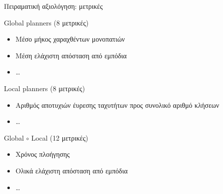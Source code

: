 \begin{frame}{Πειραματική αξιολόγηση: μετρικές}

  Global planners (8 μετρικές)
  \begin{itemize}
    \item Μέσο μήκος χαραχθέντων μονοπατιών
    \item Μέση ελάχιστη απόσταση από εμπόδια
    \item \dots
  \end{itemize}

  \vspace{0.5cm}

  Local planners (8 μετρικές)
  \begin{itemize}
    \item Αριθμός αποτυχιών έυρεσης ταχυτήτων προς συνολικό αριθμό κλήσεων
    \item \dots
  \end{itemize}

  \vspace{0.5cm}

  Global $\circ$ Local (12 μετρικές)
  \begin{itemize}
    \item Χρόνος πλοήγησης
    \item Ολικά ελάχιστη απόσταση από εμπόδια
    \item \dots
  \end{itemize}
\end{frame}
